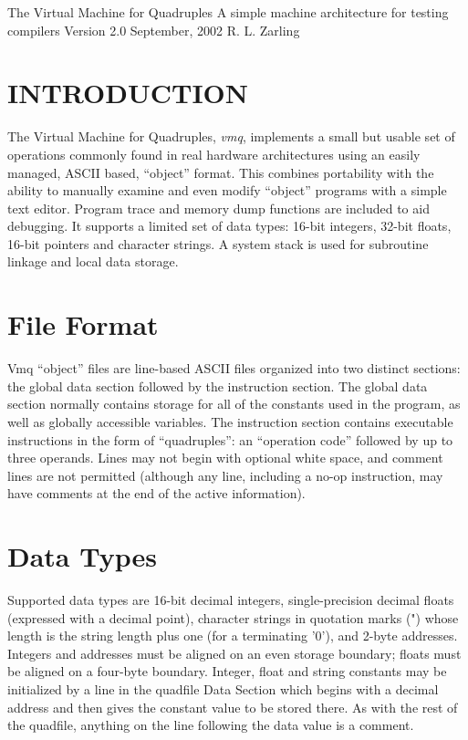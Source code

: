 \documentclass[12pt]{article}
\begin{document}
\begin{center}

{\LARGE The Virtual Machine for Quadruples}
\newline
{\large A simple machine architecture for testing compilers}
\newline
{\large Version 2.0 September, 2002}
\newline
{\large R. L. Zarling}
\newline
\end{center}

\section*{{\large INTRODUCTION}}

The Virtual Machine for Quadruples, {\em vmq}, implements a small but usable set of operations
commonly found in real hardware architectures using an easily managed, ASCII based, ``object'' format.
This combines portability with the ability to manually examine and even modify ``object'' programs with
a simple text editor. Program trace and memory dump functions are included to aid debugging. It supports
a limited set of data types: 16-bit integers, 32-bit floats, 16-bit pointers and character strings. A system stack
is used for subroutine linkage and local data storage.

\section*{File Format}
Vmq ``object'' files are line-based ASCII files organized into two distinct sections: the global data section
followed by the instruction section. The global data section normally contains storage for all of the constants
used in the program, as well as globally accessible variables. The instruction section contains executable
instructions in the form of ``quadruples'':  an ``operation code'' followed by up to three operands. Lines may
not begin with optional white space, and comment lines are not permitted (although any line, including a
no-op instruction, may have comments at the end of the active information).

\section*{Data Types}
Supported data types are 16-bit decimal integers, single-precision decimal floats (expressed with a decimal point),
character strings in quotation marks (") whose length is the string length plus one (for a terminating '0'), and
2-byte addresses. Integers and addresses must be aligned on an even storage boundary; floats must be aligned
on a four-byte boundary. Integer, float and string constants may be initialized by a line in the quadfile Data Section
which begins with a decimal address and then gives the constant value to be stored there. As with the rest of the
quadfile, anything on the line following the data value is a comment.
\newpage
\end{document}
